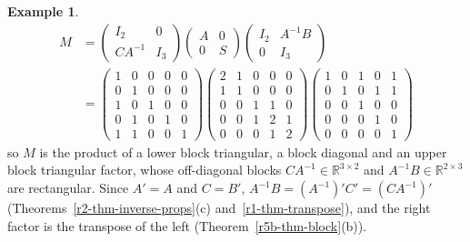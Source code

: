 \documentclass[12pt]{article}
\newcommand{\R}{\mathbb R}
\theoremstyle{definition}
\newtheorem{example}[theorem]{Example}
\begin{document}
\begin{example}
\[\begin{aligned}
M&=\begin{pmatrix}I_2&0\\CA^{-1}&I_3\end{pmatrix}\begin{pmatrix}A&0\\0&S\end{pmatrix}
\begin{pmatrix}I_2&A^{-1}B\\0&I_3\end{pmatrix}\\
&=\left(\begin{array}{cc|ccc}1&0&0&0&0\\0&1&0&0&0\\\hline1&0&1&0&0\\0&1&0&1&0\\1&1&0&0&1\end{array}\right)
\left(\begin{array}{cc|ccc}2&1&0&0&0\\1&1&0&0&0\\\hline0&0&1&1&0\\0&0&1&2&1\\0&0&0&1&2\end{array}\right)
\left(\begin{array}{cc|ccc}1&0&1&0&1\\0&1&0&1&1\\\hline0&0&1&0&0\\0&0&0&1&0\\0&0&0&0&1\end{array}\right)
\end{aligned}
\]
so \(M\) is the product of a lower block triangular, a block diagonal and an upper block triangular
factor, whose off-diagonal blocks \(CA^{-1}\in\R^{3\times2}\) and \(A^{-1}B\in\R^{2\times3}\) are
rectangular. Since \(A'=A\) and \(C=B'\), \(A^{-1}B=(A^{-1})'C'=(CA^{-1})'\)
(Theorems~\ref{r2-thm-inverse-props}(c) and~\ref{r1-thm-transpose}), and the right factor is the
transpose of the left (Theorem~\ref{r5b-thm-block}(b)).


\end{example}
\end{document}

